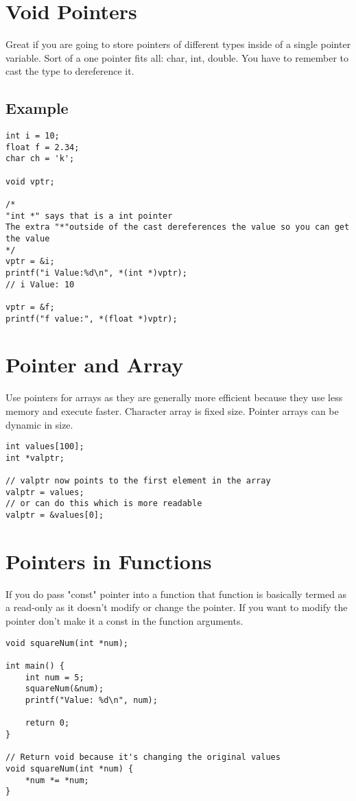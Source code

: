 \documentclass[11pt]{article}
\begin{document}
\section{Void Pointers}
Great if you are going to store pointers of different types inside of a single pointer variable. Sort of a one pointer fits all: char, int, double. You have to remember to cast the type to dereference it.

\subsection{Example}

\begin{verbatim}
int i = 10;
float f = 2.34;
char ch = 'k';

void vptr;

/*
"int *" says that is a int pointer
The extra "*"outside of the cast dereferences the value so you can get the value
*/
vptr = &i;
printf("i Value:%d\n", *(int *)vptr);
// i Value: 10

vptr = &f;
printf("f value:", *(float *)vptr);
\end{verbatim}

\section{Pointer and Array}
Use pointers for arrays as they are generally more efficient because they use less memory and execute faster. Character array is fixed size. Pointer arrays can be dynamic in size.

\begin{verbatim}
int values[100];
int *valptr;

// valptr now points to the first element in the array
valptr = values;
// or can do this which is more readable
valptr = &values[0];
\end{verbatim}

\section{Pointers in Functions}
If you do pass "const" pointer into a function that function is basically termed as a read-only as it doesn't modify or change the pointer. If you want to modify the pointer don't make it a const in the function arguments.

\begin{verbatim}
void squareNum(int *num);

int main() {
    int num = 5;
    squareNum(&num);
    printf("Value: %d\n", num);

    return 0;
}

// Return void because it's changing the original values
void squareNum(int *num) {
    *num *= *num;
}
\end{verbatim}
\end{document}
